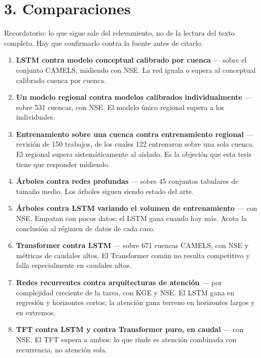 \documentclass{../comun/tesisuba}
\newcommand{\entrada}[2]{\item \textbf{#1} --- #2}
\begin{document}
\newpage

\section*{3. Comparaciones}

Recordatorio: lo que sigue sale del relevamiento, no de la lectura del texto completo.
Hay que confirmarlo contra la fuente antes de citarlo.

\medskip

\begin{enumerate}[leftmargin=*, itemsep=4pt]

\entrada{LSTM contra modelo conceptual calibrado por cuenca}{sobre el conjunto CAMELS, midiendo
con NSE. La red iguala o supera al conceptual calibrado cuenca por cuenca.
\citet{kratzert-2018-lstm-lluvia-escorrentia}}

\entrada{Un modelo regional contra modelos calibrados individualmente}{sobre 531 cuencas, con NSE.
El modelo único regional supera a los individuales.
\citet{kratzert-2019-universal-regional-local}}

\entrada{Entrenamiento sobre una cuenca contra entrenamiento regional}{revisión de 150 trabajos,
de los cuales 122 entrenaron sobre una sola cuenca. El regional supera sistemáticamente al
aislado. Es la objeción que esta tesis tiene que responder midiendo.
\citet{kratzert-2024-nunca-una-sola-cuenca}}

\entrada{Árboles contra redes profundas}{sobre 45 conjuntos tabulares de tamaño medio. Los árboles
siguen siendo estado del arte. \citet{grinsztajn-2022-arboles-tabular}}

\entrada{Árboles contra LSTM variando el volumen de entrenamiento}{con NSE. Empatan con pocos
datos; el LSTM gana cuando hay más. Acota la conclusión al régimen de datos de cada caso.
\citet{gauch-2021-camels-datos-limitados}}

\entrada{Transformer contra LSTM}{sobre 671 cuencas CAMELS, con NSE y métricas de caudales altos.
El Transformer común no resulta competitivo y falla especialmente en caudales altos.
\citet{liu-2024-transformer-limite-hidrologico}}

\entrada{Redes recurrentes contra arquitecturas de atención}{por complejidad creciente de la
tarea, con KGE y NSE. El LSTM gana en regresión y horizontes cortos; la atención gana terreno en
horizontes largos y en extremos. \citet{liu-2025-rnn-a-transformers}}

\entrada{TFT contra LSTM y contra Transformer puro, en caudal}{con NSE. El TFT supera a ambos: lo
que rinde es atención combinada con recurrencia, no atención sola.
\citet{rasiyakoya-2024-tft-caudal}}


\end{enumerate}
\end{document}
